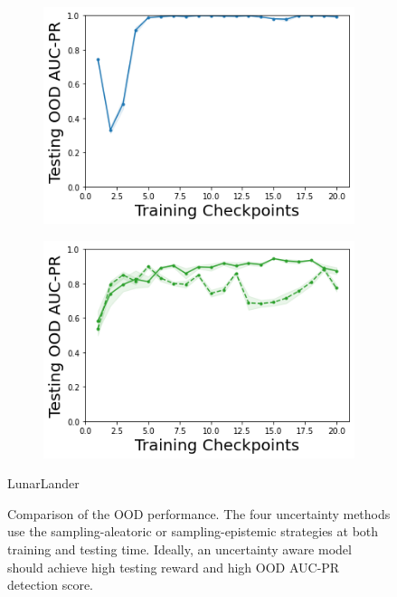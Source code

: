 \begin{figure}
\begin{subfigure}{.24\textwidth}
        \includegraphics[width=\textwidth]{sections/011_icml2022/resources/DKL-LunarLanderOOD-v0-AUC-PR-out-epistemic_-testing-strategy.png}
    \end{subfigure}
    \begin{subfigure}{.24\textwidth}
        \includegraphics[width=\textwidth]{sections/011_icml2022/resources/PostNet-LunarLanderOOD-v0-AUC-PR-out-epistemic_-testing-strategy.png}
    \end{subfigure}
    \vspace{-3mm}
    \caption*{LunarLander}
    \vspace{2mm}
    
    \caption{Comparison of the OOD performance. The four uncertainty methods use the sampling-aleatoric or sampling-epistemic strategies at both training and testing time. Ideally, an uncertainty aware model should achieve high testing reward and high OOD AUC-PR detection score.}
    \label{fig:strategy-testing-ood-auc-pr-performance}
        \vspace{-3mm}
\end{figure}